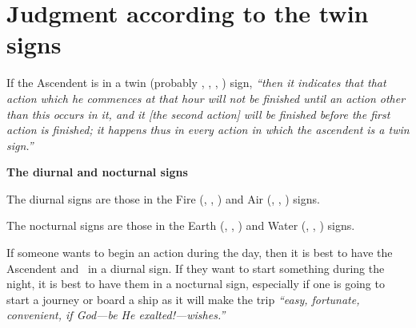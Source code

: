 \section{Judgment according to the twin signs}
If the Ascendent is in a twin (probably \Gemini, \Virgo, \Sagittarius, \Pisces) sign, \textsl{``then it indicates that that action which he commences at that hour will not be finished until an action other than this occurs in it, and it [the second action] will be finished before the first action is finished; it happens thus in every action in which the ascendent is a twin sign.''}

\textbf{The diurnal and nocturnal signs}

The diurnal signs are those in the Fire (\Aries, \Leo, \Sagittarius) and Air (\Gemini, \Libra, \Aquarius) signs.

The nocturnal signs are those in the Earth (\Taurus, \Virgo, \Capricorn) and Water (\Cancer, \Scorpio, \Pisces) signs.

If someone wants to begin an action during the day, then it is best to have the Ascendent and \Moon\, in a diurnal sign. If they want to start something during the night, it is best to have them in a nocturnal sign, especially if one is going to start a journey or board a ship as it will make the trip \textsl{``easy, fortunate, convenient, if God---be He exalted!---wishes.''}







